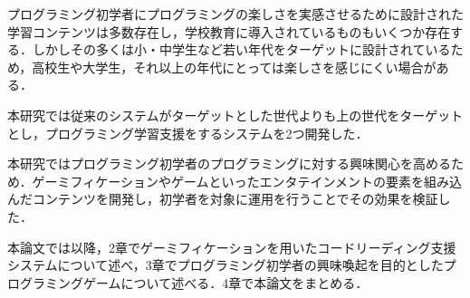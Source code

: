 プログラミング初学者にプログラミングの楽しさを実感させるために設計された学習コンテンツは多数存在し，学校教育に導入されているものもいくつか存在する．しかしその多くは小・中学生など若い年代をターゲットに設計されているため，高校生や大学生，それ以上の年代にとっては楽しさを感じにくい場合がある．

本研究では従来のシステムがターゲットとした世代よりも上の世代をターゲットとし，プログラミング学習支援をするシステムを2つ開発した．

本研究ではプログラミング初学者のプログラミングに対する興味関心を高めるため．ゲーミフィケーションやゲームといったエンタテインメントの要素を組み込んだコンテンツを開発し，初学者を対象に運用を行うことでその効果を検証した．

本論文では以降，2章でゲーミフィケーションを用いたコードリーディング支援システムについて述べ，3章でプログラミング初学者の興味喚起を目的としたプログラミングゲームについて述べる．4章で本論文をまとめる．